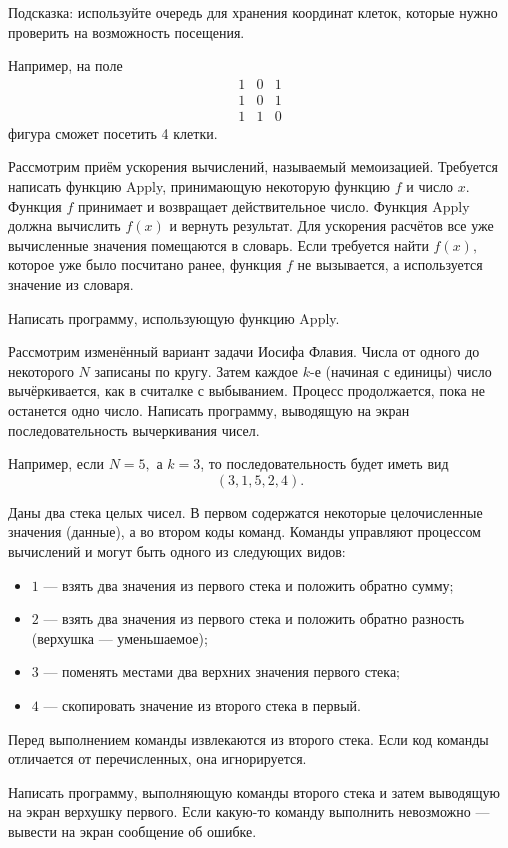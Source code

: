 Подсказка: используйте очередь для хранения координат клеток, которые
нужно проверить на возможность посещения.

Например, на поле
\[
\begin{array}{ccc}
  1 & 0 & 1 \\
  1 & 0 & 1 \\
  1 & 1 & 0
\end{array}
\]
фигура сможет посетить 4 клетки.

\task Рассмотрим приём ускорения вычислений, называемый
мемоизацией. Требуется написать функцию Apply, принимающую некоторую
функцию $f$ и число $x$. Функция $f$ принимает и возвращает
действительное число. Функция Apply должна вычислить $f(x)$ и вернуть
результат. Для ускорения расчётов все уже вычисленные значения
помещаются в словарь. Если требуется найти $f(x),$ которое уже было
посчитано ранее, функция $f$ не вызывается, а используется значение из
словаря.

Написать программу, использующую функцию Apply.

\task Рассмотрим изменённый вариант задачи Иосифа Флавия. Числа от
одного до некоторого $N$ записаны по кругу. Затем каждое $k$-е
(начиная с единицы) число вычёркивается, как в считалке с
выбыванием. Процесс продолжается, пока не останется одно
число. Написать программу, выводящую на экран последовательность
вычеркивания чисел.

Например, если $N=5,$ а $k=3$, то последовательность будет иметь вид
\[
(3, 1, 5, 2, 4).
\]

\task Даны два стека целых чисел. В первом содержатся некоторые
целочисленные значения (данные), а во втором коды команд. Команды
управляют процессом вычислений и могут быть одного из следующих видов:
\begin{itemize}
\item $1$ — взять два значения из первого стека и положить обратно
  сумму;
\item $2$ — взять два значения из первого стека и положить обратно
  разность (верхушка — уменьшаемое);
\item $3$ — поменять местами два верхних значения первого стека;
\item $4$ — скопировать значение из второго стека в первый.
\end{itemize}
Перед выполнением команды извлекаются из второго стека. Если код
команды отличается от перечисленных, она игнорируется.

Написать программу, выполняющую команды второго стека и затем
выводящую на экран верхушку первого. Если какую-то команду выполнить
невозможно — вывести на экран сообщение об ошибке.

